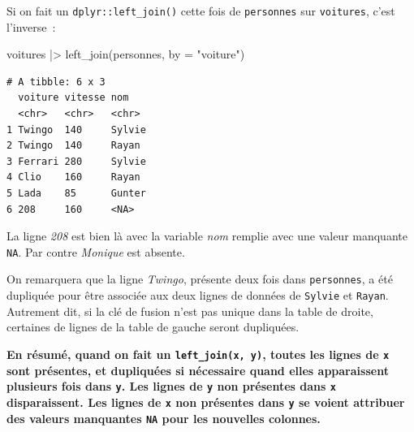 \documentclass[
  letterpaper,
  DIV=11,
  numbers=noendperiod,
  oneside]{scrreprt}
\newenvironment{Shaded}{\begin{snugshade}}{\end{snugshade}}
\newcommand{\AttributeTok}[1]{\textcolor[rgb]{0.40,0.45,0.13}{#1}}
\newcommand{\FunctionTok}[1]{\textcolor[rgb]{0.28,0.35,0.67}{#1}}
\newcommand{\NormalTok}[1]{\textcolor[rgb]{0.00,0.23,0.31}{#1}}
\newcommand{\SpecialCharTok}[1]{\textcolor[rgb]{0.37,0.37,0.37}{#1}}
\newcommand{\StringTok}[1]{\textcolor[rgb]{0.13,0.47,0.30}{#1}}
\begin{document}
Si on fait un \texttt{dplyr::left\_join()} cette fois de
\texttt{personnes} sur \texttt{voitures}, c'est l'inverse~:

\begin{Shaded}
\begin{Highlighting}[]
\NormalTok{voitures }\SpecialCharTok{|\textgreater{}} \FunctionTok{left\_join}\NormalTok{(personnes, }\AttributeTok{by =} \StringTok{"voiture"}\NormalTok{)}
\end{Highlighting}
\end{Shaded}

\begin{verbatim}
# A tibble: 6 x 3
  voiture vitesse nom   
  <chr>   <chr>   <chr> 
1 Twingo  140     Sylvie
2 Twingo  140     Rayan 
3 Ferrari 280     Sylvie
4 Clio    160     Rayan 
5 Lada    85      Gunter
6 208     160     <NA>  
\end{verbatim}

La ligne \emph{208} est bien là avec la variable \emph{nom} remplie avec
une valeur manquante \texttt{NA}. Par contre \emph{Monique} est absente.

\begin{tcolorbox}[enhanced jigsaw, colbacktitle=quarto-callout-important-color!10!white, opacityback=0, toprule=.15mm, colback=white, coltitle=black, bottomtitle=1mm, toptitle=1mm, titlerule=0mm, rightrule=.15mm, title=\textcolor{quarto-callout-important-color}{\faExclamation}\hspace{0.5em}{Important}, breakable, bottomrule=.15mm, opacitybacktitle=0.6, arc=.35mm, left=2mm, leftrule=.75mm, colframe=quarto-callout-important-color-frame]

On remarquera que la ligne \emph{Twingo}, présente deux fois dans
\texttt{personnes}, a été dupliquée pour être associée aux deux lignes
de données de \texttt{Sylvie} et \texttt{Rayan}. Autrement dit, si la
clé de fusion n'est pas unique dans la table de droite, certaines de
lignes de la table de gauche seront dupliquées.

\textbf{En résumé, quand on fait un \texttt{left\_join(x,\ y)}, toutes
les lignes de \texttt{x} sont présentes, et dupliquées si nécessaire
quand elles apparaissent plusieurs fois dans \texttt{y}. Les lignes de
\texttt{y} non présentes dans \texttt{x} disparaissent. Les lignes de
\texttt{x} non présentes dans \texttt{y} se voient attribuer des valeurs
manquantes \texttt{NA} pour les nouvelles colonnes.}

\end{tcolorbox}
\end{document}
